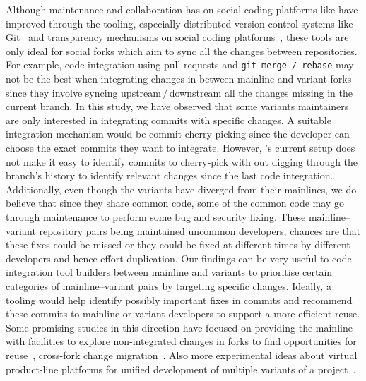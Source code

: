 Although maintenance and collaboration has on social coding platforms like \gh have improved through the tooling, especially distributed version
control systems like Git~\cite{Christian:MSR:2012} and transparency mechanisms on social coding platforms~\cite{Laura:2012:CSCW}, these tools are only ideal for social forks which aim to sync all the changes between repositories.
For example, code integration using pull requests and \texttt{git merge\,/\,rebase} may not be the best when integrating changes in between mainline and variant forks since they involve syncing upstream\,/\,downstream all the changes missing in the current branch.
In this study, we have observed that some variants maintainers are only interested in integrating commits with specific changes.
A suitable integration mechanism would be commit cherry picking since the developer can choose the exact commits they want to integrate.
However, \gh's current setup does not make it easy to identify commits to cherry-pick with out digging through the branch's history to identify relevant changes since the last code integration.
Additionally, even though the variants have diverged from their mainlines, we do believe that since they share common code, some of the common code may go through maintenance to perform some bug and security fixing. These mainline--variant repository pairs being maintained uncommon developers, chances are that these fixes could be missed or they could be fixed at different times by different developers and hence effort duplication.
Our findings can be very useful to code integration tool builders between mainline and variants to prioritise certain categories of mainline--variant pairs by targeting specific changes.
Ideally, a tooling would help identify possibly important fixes in commits and recommend these commits to mainline or variant developers to support a more efficient reuse.
Some promising studies in this direction have focused on providing the mainline with facilities to explore non-integrated changes in forks to find opportunities for reuse~\cite{Ren:2018}, cross-fork change migration~\cite{ray:2013:ASE,Ren:2019}. Also more experimental ideas about virtual product-line platforms for unified development of multiple variants of a project~\cite{Antkiewicz:icse:2014,Fischer:saner:2014,Montalvillo:spl:2015,rubin:icse:2013,Stefan:2016:icsme}.

